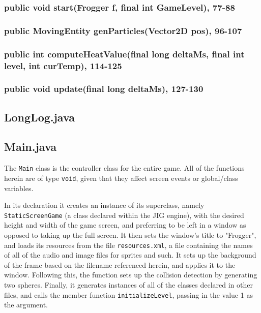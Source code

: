 \documentclass[12pt]{article}
\begin{document}
\subsubsection{public void start(Frogger f, final int GameLevel), 77-88}


\subsubsection{public MovingEntity genParticles(Vector2D pos), 96-107}

\subsubsection{public int computeHeatValue(final long deltaMs, final int level, int curTemp), 114-125}

\subsubsection{public void update(final long deltaMs), 127-130}


\subsection{LongLog.java}

\subsection{Main.java}
The \verb|Main| class is the controller class for the entire game.
All of the functions herein are of type \verb|void|, given that they affect screen events or global/class variables.

In its declaration it creates an instance of its superclass, namely \verb|StaticScreenGame| (a class declared within the JIG engine), with the desired height and width of the game screen, and preferring to be left in a window as opposed to taking up the full screen.
It then sets the window's title to "Frogger", and loads its resources from the file \verb|resources.xml|, a file containing the names of all of the audio and image files for sprites and such.
It sets up the background of the frame based on the filename referenced herein, and applies it to the window.
Following this, the function sets up the collision detection by generating two spheres.
Finally, it generates instances of all of the classes declared in other files, and calls the member function \verb|initializeLevel|, passing in the value 1 as the argument.
\end{document}
